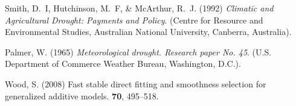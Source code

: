 \documentclass[a4paper]{article}                %
\begin{document}
        \begin{thebibliography}{1}

        Smith, D.~I, Hutchinson, M.~F,  \& McArthur, R.~J.
        \newblock (1992) {\em {Climatic and Agricultural Drought: Payments and
        Policy}}.
        \newblock (Centre for Resource and Environmental Studies, Australian National
        University, Canberra, Australia).

        Palmer, W.
        \newblock (1965) {\em {Meteorological drought. Research paper No. 45}}.
        \newblock (U.S. Department of Commerce Weather Bureau, Washington, D.C.).

        Wood, S.
        \newblock (2008) {Fast stable direct fitting and smoothness selection for
        generalized additive models}.
         {\bf 70}, 495--518.

        \end{thebibliography}










\end{document}
